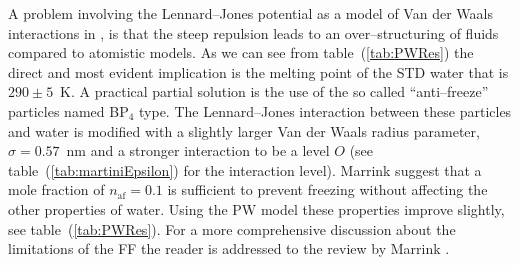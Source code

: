 A problem involving the Lennard--Jones potential as a model of Van der Waals interactions in \martini{}, is that
the steep repulsion leads to an over--structuring of fluids compared to atomistic models. As we can see from
table~(\ref{tab:PWRes}) the direct and most evident implication is the melting point of the \acs{STD} \martini{}
water that is $290 \pm 5$~K. A practical partial solution is the use of the so called ``anti--freeze'' particles
named BP$_4$ type. The Lennard--Jones interaction between these particles and water is modified with a slightly
larger Van der Waals radius parameter, $\sigma = 0.57$~nm and a stronger interaction to be a level $O$ (see
table~(\ref{tab:martiniEpsilon}) for the interaction level). Marrink \etal{} suggest that a mole fraction of
$n_{\text{af}} = 0.1$ is sufficient to prevent freezing without affecting the other properties of water.
Using the \ac{PW} model these properties improve slightly, see table~(\ref{tab:PWRes}). For a more comprehensive
discussion about the limitations of the \martini{} \ac{FF} the reader is addressed to the review by Marrink 
\etal{} \cite{MartiniReview}.

